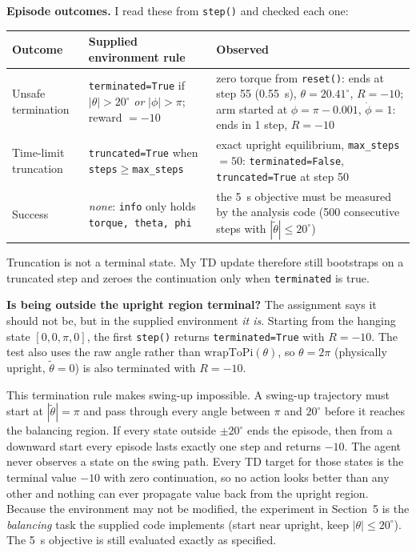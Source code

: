 \documentclass[11pt]{article}
\newcommand{\thw}{\tilde\theta}
\begin{document}
\textbf{Episode outcomes.} I read these from \texttt{step()} and checked each one:
\begin{center}
\small
\begin{tabular}{p{2.6cm}p{5.6cm}p{6.4cm}}\toprule
Outcome & Supplied environment rule & Observed\\\midrule
Unsafe termination & \texttt{terminated=True} if $|\theta|>20^\circ$ \emph{or} $|\phi|>\pi$; reward $=-10$ &
zero torque from \texttt{reset()}: ends at step 55 (0.55~s), $\theta=20.41^\circ$, $R=-10$;
arm started at $\phi=\pi-0.001$, $\dot\phi=1$: ends in 1 step, $R=-10$\\
Time-limit truncation & \texttt{truncated=True} when \texttt{steps}$\ge$\texttt{max\_steps} &
exact upright equilibrium, \texttt{max\_steps}$=50$: \texttt{terminated=False}, \texttt{truncated=True} at step 50\\
Success & \emph{none}: \texttt{info} only holds \texttt{torque, theta, phi} &
the 5~s objective must be measured by the analysis code (500 consecutive steps with $|\thw|\le20^\circ$)\\\bottomrule
\end{tabular}
\end{center}
Truncation is not a terminal state. My TD update therefore still bootstraps on a
truncated step and zeroes the continuation only when \texttt{terminated} is true.

\textbf{Is being outside the upright region terminal?} The assignment says it
should not be, but in the supplied environment \emph{it is}. Starting from the
hanging state $[0,0,\pi,0]$, the first \texttt{step()} returns
\texttt{terminated=True} with $R=-10$. The test also uses the raw angle rather
than $\mathrm{wrapToPi}(\theta)$, so $\theta=2\pi$ (physically upright,
$\thw=0$) is also terminated with $R=-10$.

This termination rule makes swing-up impossible. A swing-up trajectory must start
at $|\thw|=\pi$ and pass through every angle between $\pi$ and $20^\circ$ before
it reaches the balancing region. If every state outside $\pm20^\circ$ ends the
episode, then from a downward start every episode lasts exactly one step and
returns $-10$. The agent never observes a state on the swing path. Every TD target
for those states is the terminal value $-10$ with zero continuation, so no action
looks better than any other and nothing can ever propagate value back from the
upright region. Because the environment may not be modified, the experiment in
Section~5 is the \emph{balancing} task the supplied code implements (start near
upright, keep $|\theta|\le20^\circ$). The 5~s objective is still evaluated
exactly as specified.
\end{document}
